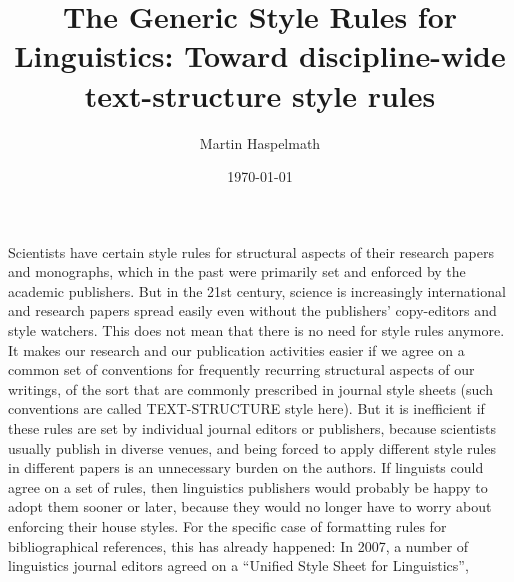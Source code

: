 \documentclass[a4paper]{article}
\date{\today}
\title{The Generic Style Rules for Linguistics: Toward discipline-wide text-structure style rules}
\author{Martin Haspelmath}
\begin{document}
 
\maketitle 

Scientists have
certain style rules for structural aspects of their research papers and
monographs, which in the past were primarily set and enforced by the
academic publishers. But in the 21st century, science is increasingly
international and research papers spread easily even without the
publishers' copy-editors and style watchers. This does not mean that
there is no need for style rules anymore. It makes our research and our
publication activities easier if we agree on a common set of conventions
for frequently recurring structural aspects of our writings, of the sort
that are commonly prescribed in journal style sheets (such conventions
are called TEXT-STRUCTURE style here). But it is inefficient if these
rules are set by individual journal editors or publishers, because
scientists usually publish in diverse venues, and being forced to apply
different style rules in different papers is an unnecessary burden on
the authors. If linguists could agree on a set of rules, then
linguistics publishers would probably be happy to adopt them sooner or
later, because they would no longer have to worry about enforcing their
house styles. For the specific case of formatting rules for
bibliographical references, this has already happened: In 2007, a number
of linguistics journal editors agreed on a ``Unified Style Sheet for
Linguistics'',
\end{document}
